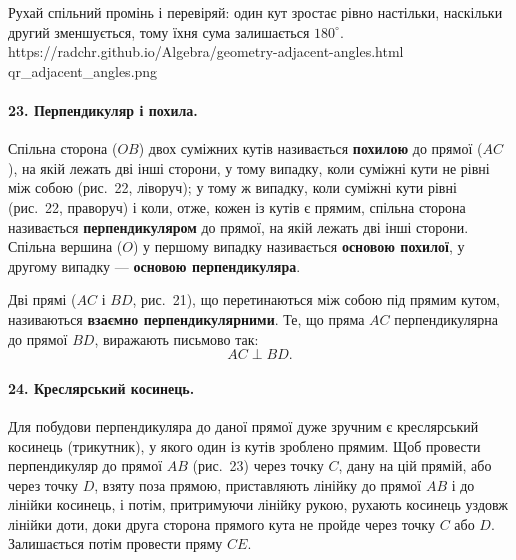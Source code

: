 %
{Рухай спільний промінь і перевіряй: один кут зростає рівно настільки, наскільки другий зменшується, тому їхня сума залишається $180^\circ$.}%
{https://radchr.github.io/Algebra/geometry-adjacent-angles.html}%
{qr_adjacent_angles.png}

\paragraph{23. Перпендикуляр і похила.}
Спільна сторона ($OB$) двох суміжних кутів називається \textbf{похилою} до прямої ($AC$), на якій лежать дві інші сторони, у тому випадку, коли суміжні кути не рівні між собою (рис.~22, ліворуч); у тому ж випадку, коли суміжні кути рівні (рис.~22, праворуч) і коли, отже, кожен із кутів є прямим, спільна сторона називається \textbf{перпендикуляром} до прямої, на якій лежать дві інші сторони. Спільна вершина ($O$) у першому випадку називається \textbf{основою похилої}, у другому випадку — \textbf{основою перпендикуляра}.

\begin{center}
\end{center}

Дві прямі ($AC$ і $BD$, рис.~21), що перетинаються між собою під прямим кутом, називаються \textbf{взаємно перпендикулярними}. Те, що пряма $AC$ перпендикулярна до прямої $BD$, виражають письмово так:
\[
AC \perp BD.
\]

\paragraph{24. Креслярський косинець.}
Для побудови перпендикуляра до даної прямої дуже зручним є креслярський косинець (трикутник), у якого один із кутів зроблено прямим. Щоб провести перпендикуляр до прямої $AB$ (рис.~23) через точку $C$, дану на цій прямій, або через точку $D$, взяту поза прямою, приставляють лінійку до прямої $AB$ і до лінійки косинець, і потім, притримуючи лінійку рукою, рухають косинець уздовж лінійки доти, доки друга сторона прямого кута не пройде через точку $C$ або $D$. Залишається потім провести пряму $CE$.


